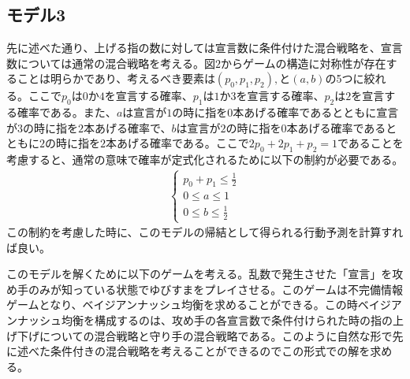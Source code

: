 \documentclass{jsarticle}
\begin{document}
\subsection{モデル3}
先に述べた通り、上げる指の数に対しては宣言数に条件付けた混合戦略を、宣言数については通常の混合戦略を考える。図$2$からゲームの構造に対称性が存在することは明らかであり、考えるべき要素は$(p_0,p_1,p_2),$と$(a, b)$の5つに絞れる。ここで$p_0$は$0$か$4$を宣言する確率、$p_1$は$1$か$3$を宣言する確率、$p_2$は$2$を宣言する確率である。また、$a$は宣言が$1$の時に指を$0$本あげる確率であるとともに宣言が$3$の時に指を$2$本あげる確率で、$b$は宣言が$2$の時に指を$0$本あげる確率であるとともに$2$の時に指を$2$本あげる確率である。ここで$2p_0 + 2p_1 + p_2 = 1$であることを考慮すると、通常の意味で確率が定式化されるために以下の制約が必要である。
\begin{align}
\begin{cases} 
p_0 + p_1 \leq \frac{1}{2}\\[7pt]
0 \leq a \leq 1\\[7pt]
0\leq b \leq \frac{1}{2}
\end{cases}
\end{align}
この制約を考慮した時に、このモデルの帰結として得られる行動予測を計算すれば良い。

このモデルを解くために以下のゲームを考える。乱数で発生させた「宣言」を攻め手のみが知っている状態でゆびすまをプレイさせる。このゲームは不完備情報ゲームとなり、ベイジアンナッシュ均衡を求めることができる。この時ベイジアンナッシュ均衡を構成するのは、攻め手の各宣言数で条件付けられた時の指の上げ下げについての混合戦略と守り手の混合戦略である。このように自然な形で先に述べた条件付きの混合戦略を考えることができるのでこの形式での解を求める。
\end{document}
